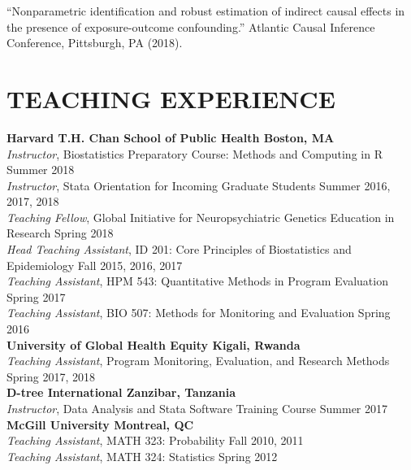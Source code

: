 \documentclass[12pt]{article}
\begin{document}
``Nonparametric identification and robust estimation of indirect causal effects in the presence of exposure-outcome confounding.'' Atlantic Causal Inference Conference, Pittsburgh, PA (2018). 



\section*{\textbf{{\large T}{EACHING} {\large E}{XPERIENCE}}}
\textbf{Harvard T.H. Chan School of Public Health \hfill \hfill Boston, MA} \\
\textit{Instructor}, Biostatistics Preparatory Course: Methods and Computing in R \hfill \hfill Summer 2018 \\
\textit{Instructor}, Stata Orientation for Incoming Graduate Students \hfill \hfill	Summer 2016, 2017, 2018\\
\textit{Teaching Fellow}, Global Initiative for Neuropsychiatric Genetics Education in Research \hfill \hfill Spring 2018 \\
\textit{Head Teaching Assistant}, ID 201: Core Principles of Biostatistics and Epidemiology \hfill \hfill Fall 2015, 2016, 2017 \\
\textit{Teaching Assistant}, HPM 543: Quantitative Methods in Program Evaluation \hfill \hfill Spring 2017 \\
\textit{Teaching Assistant}, BIO 507: Methods for Monitoring and Evaluation \hfill \hfill Spring 2016 \\

\textbf{University of Global Health Equity \hfill \hfill Kigali, Rwanda} \\
\textit{Teaching Assistant}, Program Monitoring, Evaluation, and Research Methods  \hfill \hfill Spring 2017, 2018 \\

\textbf{D-tree International \hfill \hfill Zanzibar, Tanzania}\\
\textit{Instructor}, Data Analysis and Stata Software Training Course \hfill \hfill Summer 2017  \\

\textbf{McGill University \hfill \hfill Montreal, QC}\\
\textit{Teaching Assistant}, MATH 323: Probability \hfill \hfill Fall 2010, 2011 \\
\textit{Teaching Assistant}, MATH 324: Statistics \hfill \hfill Spring 2012 
\end{document}
